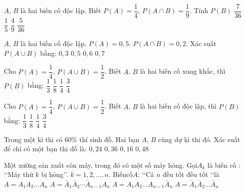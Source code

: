 \begin{ex}
$A$, $B$ là hai biến cố độc lập. Biết $P(A)=\dfrac{1}{4}$, $P\left(A\cap B\right)=\dfrac{1}{9}$. Tính $P(B)$
\choice
{$\dfrac{7}{36}$}
{$\dfrac{1}{5}$}
{\True $\dfrac{4}{9}$}
{$\dfrac{5}{36}$}
\end{ex}
\begin{ex}
$A$, $B$ là hai biến cố độc lập. $P(A)=0{,}5$. $P\left(A\cap B\right)=0{,}2$. Xác suất $P\left(A\cup B\right)$ bằng:
\choice
{$0{,}3$}
{$0{,}5$}
{$0{,}6$}
{\True $0{,}7$}
\end{ex}
\begin{ex}
Cho $P(A)=\dfrac{1}{4}$, $P\left(A\cup B\right)=\dfrac{1}{2}$. Biết $A$, $B$ là hai biến cố xung khắc, thì $P(B)$ bằng:
\choice
{$\dfrac{1}{3}$}
{$\dfrac{1}{8}$}
{\True $\dfrac{1}{4}$}
{$\dfrac{3}{4}$}
\end{ex}
\begin{ex}
Cho $P(A)=\dfrac{1}{4}$, $P\left(A\cup B\right)=\dfrac{1}{2}$. Biết $A$, $B$ là hai biến cố độc lập, thì $P(B)$ bằng:
\choice
{\True $\dfrac{1}{3}$}
{$\dfrac{1}{8}$}
{$\dfrac{1}{4}$}
{$\dfrac{3}{4}$}
\end{ex}
\begin{ex}
Trong một kì thi có $60\%$ thí sinh đỗ. Hai bạn $A$, $B$ cùng dự kì thi đó. Xác suất để chỉ có một bạn thi đỗ là:
\choice
{$0{,}24$}
{$0{,}36$}
{$0{,}16$}
{\True $0{,}48$}
\end{ex}
\begin{ex}
Một xưởng sản xuất cón máy, trong đó có một số máy hỏng. Gọi$A_k$ là biến cố : \lq\lq   Máy thứ $k$ bị hỏng\rq\rq . $k=1{,}2,\ldots ,n$. Biếncố$A$: \lq\lq   Cả $n$ đều tốt đều tốt \lq\lq   là
\choice
{$A=A_1A_2\ldots A_n$}
{$A=\bar{A}_1\bar{A}_2\cdots \bar{A}_{n-1} A_n$}
{$A=A_1A_2\ldots A_{n-1}\bar{A}_n$}
{\True $A=\bar{A}_1\bar{A}_2\ldots \bar{A}_n$}
\end{ex}
